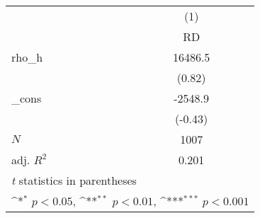 {
\def\sym#1{\ifmmode^{#1}\else\(^{#1}\)\fi}
\begin{tabular}{l*{1}{c}}
\toprule
            &\multicolumn{1}{c}{(1)}\\
            &\multicolumn{1}{c}{RD}\\
\midrule
rho\_h       &     16486.5         \\
            &      (0.82)         \\
\addlinespace
\_cons      &     -2548.9         \\
            &     (-0.43)         \\
\midrule
\(N\)       &        1007         \\
adj. \(R^{2}\)&       0.201         \\
\bottomrule
\multicolumn{2}{l}{\footnotesize \textit{t} statistics in parentheses}\\
\multicolumn{2}{l}{\footnotesize \sym{*} \(p<0.05\), \sym{**} \(p<0.01\), \sym{***} \(p<0.001\)}\\
\end{tabular}
}
